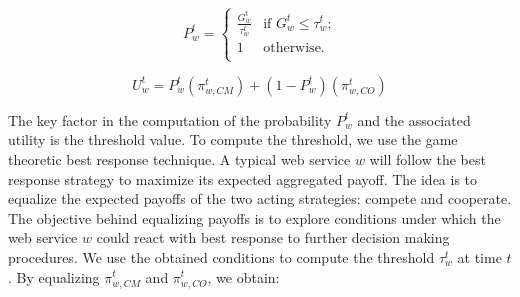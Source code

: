 \documentclass[fleqn]{singlecol-new}
\begin{document}
\begin{equation} \label{P}
P_w^t= \begin{cases}
\frac{G_w^t}{\tau_w^t}  & \text{if $G_w^t\leq \tau_w^t$;}\\
1 & \text{otherwise.}\\
\end{cases}
\end{equation}

\begin{equation}\label{U}
U_w^t=P_w^t(\pi_{w,CM}^t)+(1-P_w^t)(\pi_{w,CO}^t)
\end{equation}




The key factor in the computation of the probability $P_w^t$ and
the associated utility is the threshold value. To compute the
threshold, we use the game theoretic best response technique. A
typical web service $w$ will follow the best response strategy to
maximize its expected aggregated payoff. The idea is to equalize
the expected payoffs of the two acting strategies: compete and
cooperate.
%
%
%
The objective behind equalizing payoffs is to explore conditions
under which the web service $w$ could react with best response to
further decision making procedures. We use the obtained conditions
to compute the threshold $\tau_w^t$ at time $t$. By equalizing
$\pi_{w,CM}^t$ and $\pi_{w,CO}^t$, we obtain:
\end{document}

